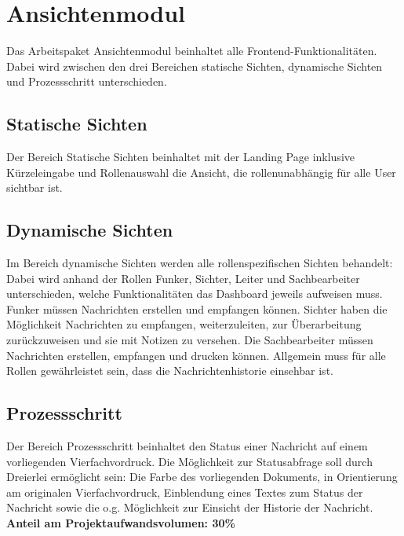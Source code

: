 \section{Ansichtenmodul} 
Das Arbeitspaket Ansichtenmodul beinhaltet alle Frontend-Funktionalitäten. 
Dabei wird zwischen den drei Bereichen statische Sichten, dynamische Sichten 
und Prozessschritt unterschieden. 
\subsection{Statische Sichten}
Der Bereich Statische Sichten beinhaltet mit der Landing Page inklusive 
Kürzeleingabe und Rollenauswahl die Ansicht, die rollenunabhängig für 
alle User sichtbar ist. 
\subsection{Dynamische Sichten}
Im Bereich dynamische Sichten werden alle rollenspezifischen Sichten 
behandelt: Dabei wird anhand der Rollen Funker, Sichter, Leiter und 
Sachbearbeiter unterschieden, welche Funktionalitäten das Dashboard jeweils 
aufweisen muss. Funker müssen Nachrichten erstellen und empfangen können.
Sichter haben die Möglichkeit Nachrichten zu empfangen, weiterzuleiten, zur 
Überarbeitung zurückzuweisen und sie mit Notizen zu versehen. Die Sachbearbeiter 
müssen Nachrichten erstellen, empfangen und drucken können. 
Allgemein muss für alle Rollen gewährleistet sein, dass die 
Nachrichtenhistorie einsehbar ist. 
\subsection{Prozessschritt}
Der Bereich Prozessschritt beinhaltet den Status einer Nachricht 
auf einem vorliegenden Vierfachvordruck. Die Möglichkeit zur Statusabfrage 
soll durch Dreierlei ermöglicht sein: Die Farbe des vorliegenden Dokuments, 
in Orientierung am originalen Vierfachvordruck, Einblendung eines 
Textes zum Status der Nachricht sowie die o.g. Möglichkeit zur Einsicht der 
Historie der Nachricht.
\textbf{Anteil am Projektaufwandsvolumen: 30\%}